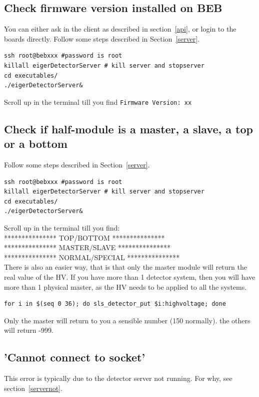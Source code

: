 \documentclass{article}
\begin{document}
{{{\subsection{Check firmware version installed on BEB}
You can either ask in the client as described in section~\ref{api}, or login to the boards directly. Follow some steps described in Section~\ref{server}. 
\begin{verbatim}
ssh root@bebxxx #password is root
killall eigerDetectorServer # kill server and stopserver
cd executables/
./eigerDetectorServer&
\end{verbatim}
Scroll up in the terminal till you find {\tt{Firmware Version: xx}}

\subsection{Check if half-module is a master, a slave, a top or a bottom}
Follow some steps described in Section~\ref{server}.
\begin{verbatim}
ssh root@bebxxx #password is root
killall eigerDetectorServer # kill server and stopserver
cd executables/
./eigerDetectorServer&
\end{verbatim}
Scroll up in the terminal till you find:\\
*************** TOP/BOTTOM ***************\\
*************** MASTER/SLAVE ***************\\
*************** NORMAL/SPECIAL ***************\\

There is also an easier way, that is that only the master module will return the real value of the HV. If you have more than 1 detector system, then you will have more than 1 physical master, as the HV needs to be applied to all the systems.

\begin{verbatim}
for i in $(seq 0 36); do sls_detector_put $i:highvoltage; done
\end{verbatim}
 Only the master will return to you a sensible number (150 normally). the others will return -999.

\subsection{'Cannot connect to socket'}
This error is typically due to the detector server not running. For why, see section~\ref{servernot}.

}}}
\end{document}

